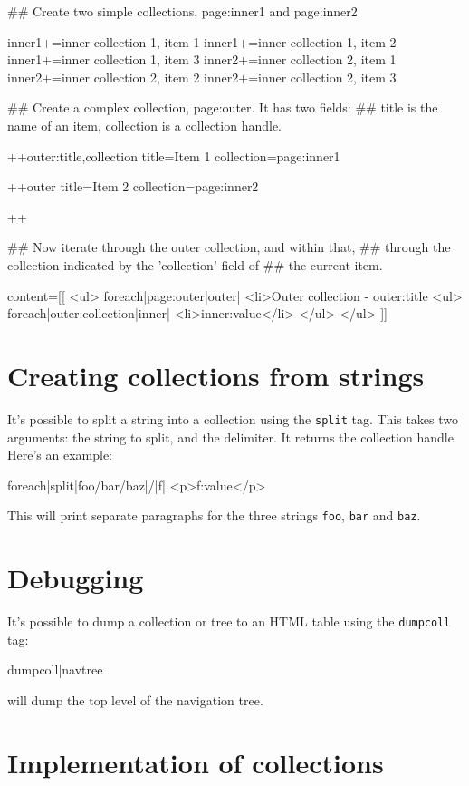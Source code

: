 \begin{MyVerbatim}

## Create two simple collections, page:inner1 and page:inner2

inner1+=inner collection 1, item 1
inner1+=inner collection 1, item 2
inner1+=inner collection 1, item 3
inner2+=inner collection 2, item 1
inner2+=inner collection 2, item 2
inner2+=inner collection 2, item 3

## Create a complex collection, page:outer. It has two fields:
## title is the name of an item, collection is a collection handle.

++outer:title,collection
title=Item 1
collection={{page:inner1}}

++outer
title=Item 2
collection={{page:inner2}}

++

## Now iterate through the outer collection, and within that,
## through the collection indicated by the 'collection' field of
## the current item.

content=[[
    <ul>
    {{foreach|{{page:outer}}|outer|
        <li>Outer collection - {{outer:title}}
        <ul>
            {{foreach|{{outer:collection}}|inner|
                <li>{{inner:value}}</li>}}
        </ul>}}
    </ul>
]]
\end{MyVerbatim}

\section{Creating collections from strings}
\label{collsplit}
It's possible to split a string into a collection using the \texttt{split}
tag. This takes two arguments: the string to split, and the delimiter. It
returns the collection handle. Here's
an example:
\begin{MyVerbatim}
{{foreach|{{split|foo/bar/baz|/}}|f|
    <p>{{f:value}}</p>}}
\end{MyVerbatim}
This will print separate paragraphs for the three strings \texttt{foo},
\texttt{bar} and \texttt{baz}.     

\section{Debugging}
It's possible to dump a collection or tree to an HTML table using the \texttt{dumpcoll} tag:
\begin{MyVerbatim}
{{dumpcoll|{{navtree}}}}
\end{MyVerbatim}
will dump the top level of the navigation tree.

\section{Implementation of collections}
\label{collimp}
